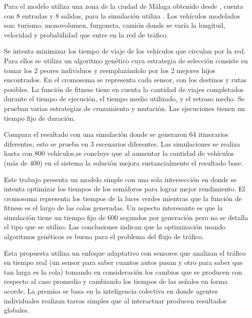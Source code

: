 \begin{itemize}
\begin{item}
Para el modelo utiliza una zona  de la ciudad de Málaga obtenido desde \citep{OSM}, cuenta con 8 entradas y 8 salidas, para la simulación utiliza \citep{SUMO}. Los vehículos modelados son: turismo, monovolumen, furgoneta, camión donde se varía la longitud, velocidad y probabilidad que entre en la red de tráfico.

Se intenta minimizar los tiempo de viaje de los vehículos que circulan por la red. Para ellos se utiliza un algoritmo genético cuya estrategia de selección consiste en tomar los 2 peores individuos y reemplazándolo por los 2 mejores hijos encontrados. En el cromosoma se representa cada sensor, con los destinos y rutas posibles. La función de fitness tiene en cuenta la cantidad de viajes completados durante el tiempo de ejecución, el tiempo medio utilizado, y el retraso medio. Se prueban varias estrategias de cruzamiento y mutación. Las ejecuciones tienen un tiempo fijo de duración.


Compara el resultado con una simulación donde se generaron 64 itinerarios diferentes, esto se prueba en 3 escenarios diferentes. Las simulaciones se realiza hasta con 800 vehículos,se concluye que al aumentar la cantidad de vehículos (más de 400) en el sistema la solución mejora sustancialmente el resultado base.

	\end{item}	
	
	
	\begin{item}
Este trabajo presenta un modelo simple con una sola intersección en donde se intenta optimizar los tiempos de los semáforos para lograr mejor rendimiento. El cromosoma representa los tiempos de la luces verdes mientras que la función de fitness es el largo de las colas generadas. Un aspecto interesante es que la simulación tiene un tiempo fijo de 600 segundos por generación pero no se detalla el tipo que se utilizo. Las conclusiones indican que la optimización usando algoritmos genéticos  es buena para el problema del flujo de tráfico.	
	\end{item}	


	\begin{item}
		\bibentry{Montana1996}
Esta propuesta utiliza un enfoque adaptativo con sensores que analizan el tráfico en tiempo real (un sensor para saber cuantos autos pasan y otro para saber que tan larga es la cola) tomando en consideración los cambios que se producen con respecto al caso promedio y cambiando los tiempos de las señales en forma acorde.
La premisa se basa en la inteligencia colectiva en donde agentes individuales realizan tareas simples que al interactuar producen resultados globales.


\end{item}
\end{itemize}
